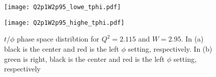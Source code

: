 \begin{figure}
  \centering
  \begin{minipage}[b]{0.48\linewidth}
    \texttt{[image: Q2p1W2p95\_lowe\_tphi.pdf]}
  \end{minipage}
  \hfill
  \begin{minipage}[b]{0.48\linewidth}
    \texttt{[image: Q2p1W2p95\_highe\_tphi.pdf]}
  \end{minipage}  
  \caption{$t$/$\phi$ phase space distribtion for $Q^2=2.115$ and $W=2.95$. In (a) black is the center and red is the left $\phi$ setting, respectively. In (b) green is right, black is the center and red is the left $\phi$ setting, respectively}
  \label{fig:Q2p1W2p95_tphi}
\end{figure}

